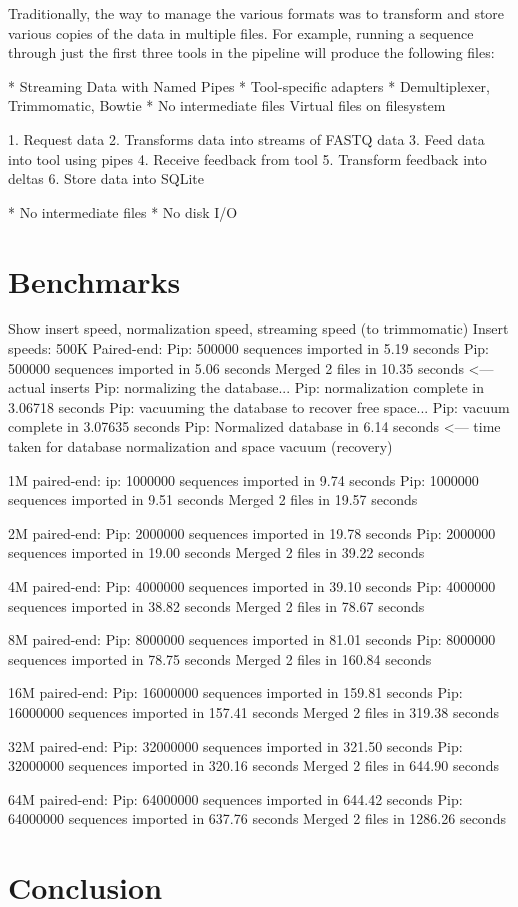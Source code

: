 \documentclass[12pt]{article}
\begin{document}
Traditionally, the way to manage the various formats was to transform and store
various copies of the data in multiple files. For example, running a sequence through
just the first three tools in the pipeline will produce the following files:



* Streaming Data with Named Pipes
	* Tool-specific adapters
* Demultiplexer, Trimmomatic, Bowtie
* No intermediate files Virtual files on filesystem

1. Request data
2. Transforms data into streams of FASTQ data
3. Feed data into tool using pipes
4. Receive feedback from tool
5. Transform feedback into deltas
6. Store data into SQLite

* No intermediate files
* No disk I/O

\section{Benchmarks} %
\label{sec:benchmarks}
Show insert speed, normalization speed, streaming speed (to trimmomatic)
Insert speeds:
500K Paired-end:
Pip: 500000 sequences imported in 5.19 seconds
Pip: 500000 sequences imported in 5.06 seconds
Merged 2 files in 10.35 seconds <— actual inserts
Pip: normalizing the database...
Pip: normalization complete in 3.06718 seconds
Pip: vacuuming the database to recover free space...
Pip: vacuum complete in 3.07635 seconds
Pip: Normalized database in 6.14 seconds <— time taken for database normalization and space vacuum (recovery)

1M paired-end:
ip: 1000000 sequences imported in 9.74 seconds
Pip: 1000000 sequences imported in 9.51 seconds
Merged 2 files in 19.57 seconds

2M paired-end:
Pip: 2000000 sequences imported in 19.78 seconds
Pip: 2000000 sequences imported in 19.00 seconds
Merged 2 files in 39.22 seconds

4M paired-end:
Pip: 4000000 sequences imported in 39.10 seconds
Pip: 4000000 sequences imported in 38.82 seconds
Merged 2 files in 78.67 seconds

8M paired-end:
Pip: 8000000 sequences imported in 81.01 seconds
Pip: 8000000 sequences imported in 78.75 seconds
Merged 2 files in 160.84 seconds

16M paired-end:
Pip: 16000000 sequences imported in 159.81 seconds
Pip: 16000000 sequences imported in 157.41 seconds
Merged 2 files in 319.38 seconds

32M paired-end:
Pip: 32000000 sequences imported in 321.50 seconds
Pip: 32000000 sequences imported in 320.16 seconds
Merged 2 files in 644.90 seconds

64M paired-end:
Pip: 64000000 sequences imported in 644.42 seconds
Pip: 64000000 sequences imported in 637.76 seconds
Merged 2 files in 1286.26 seconds
\section{Conclusion} %
\label{sec:conclusion}

\end{document}

